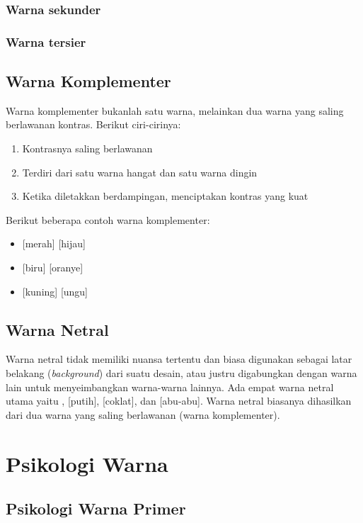 \documentclass[a4paper,12pt]{article}
\newcommand{\warnalnbl}[1]{
  \tikz[baseline=-0.5\ht\strutbox]{
    \node[shape=rectangle, draw=black, fill=black, minimum height=1.5em, inner sep= 2pt, text=white]{#1}
  }
}
\begin{document}
\subsubsection{Warna sekunder}
\subsubsection{Warna tersier}



\subsection{Warna Komplementer}
Warna komplementer bukanlah satu warna, melainkan dua warna yang saling berlawanan kontras. Berikut ciri-cirinya:
\begin{enumerate}
  \item Kontrasnya saling berlawanan
  \item Terdiri dari satu warna hangat dan satu warna dingin
  \item Ketika diletakkan berdampingan, menciptakan kontras yang kuat
\end{enumerate}

Berikut beberapa contoh warna komplementer:
\begin{itemize}
  \item {}[merah] [hijau]
  \item {}[biru] [oranye]
  \item {}[kuning] [ungu]
\end{itemize}

\subsection{Warna Netral}
Warna netral tidak memiliki nuansa tertentu dan biasa digunakan sebagai latar belakang (\textit{background}) dari suatu desain, atau justru digabungkan dengan warna lain untuk menyeimbangkan warna-warna lainnya. Ada empat warna netral utama yaitu \warnalnbl{Hitam}, [putih], [coklat], dan [abu-abu]. Warna netral biasanya dihasilkan dari dua warna yang saling berlawanan (warna komplementer).

\section{Psikologi Warna}
\subsection{Psikologi Warna Primer}
\end{document}
